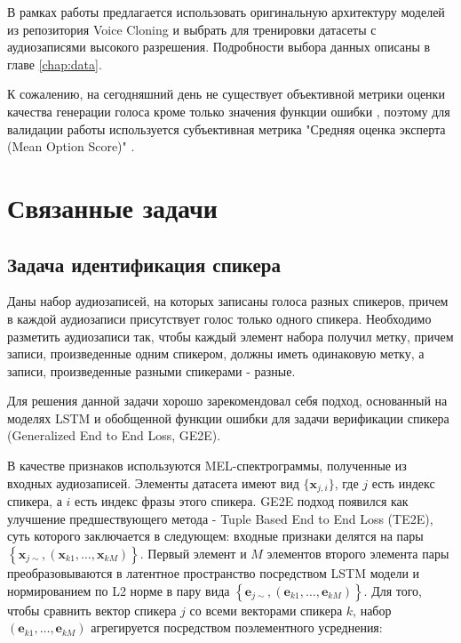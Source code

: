 \documentclass[oneside,final,14pt]{extreport}
\begin{document}
В рамках работы предлагается использовать оригинальную архитектуру моделей из репозитория Voice Cloning\cite{bib:voice_cloning} и выбрать для тренировки датасеты с аудиозаписями высокого разрешения. Подробности выбора данных описаны в главе \ref{chap:data}.

К сожалению, на сегодняшний день не существует объективной метрики оценки качества генерации голоса кроме только значения функции ошибки \cite{bib:voice_cloning}, поэтому для валидации работы используется субъективная метрика "Средняя оценка эксперта (Mean Option Score)" .
\section{Связанные задачи}
\subsection{Задача идентификация спикера}

Даны набор аудиозаписей, на которых записаны голоса разных спикеров, причем в каждой аудиозаписи присутствует голос только одного спикера. Необходимо разметить аудиозаписи так, чтобы каждый элемент набора получил метку, причем записи, произведенные одним спикером, должны иметь одинаковую метку, а записи, произведенные разными спикерами - разные.

Для решения данной задачи хорошо зарекомендовал себя подход, основанный на моделях LSTM \cite{bib:lstm} и обобщенной функции ошибки для задачи верификации спикера (Generalized End to End Loss, GE2E)\cite{bib:e2e_speaker_ver_loss}.

В качестве признаков используются MEL-спектрограммы, полученные из входных аудиозаписей. Элементы датасета имеют вид $\{\mathbf{x}_{j,i}\}$, где $j$  есть индекс спикера, а $i$ есть индекс фразы этого спикера. GE2E подход появился как улучшение предшествующего метода - Tuple Based End to End Loss (TE2E), суть которого заключается в следующем: входные признаки делятся на пары $\left\{\mathbf{x}_{j \sim},\left(\mathbf{x}_{k 1}, \ldots, \mathbf{x}_{k M}\right)\right\}$.
Первый элемент и $M$ элементов второго элемента пары преобразовываются в латентное пространство посредством LSTM модели \cite{bib:lstm} и нормированием по L2 норме в пару вида $\left\{\mathbf{e}_{j \sim},\left(\mathbf{e}_{k 1}, \ldots, \mathbf{e}_{k M}\right)\right\}$. Для того, чтобы сравнить вектор спикера $j$ со всеми векторами спикера $k$, набор $\left(\mathbf{e}_{k 1}, \ldots, \mathbf{e}_{k M}\right)$ агрегируется посредством поэлементного усреднения:
\end{document}
